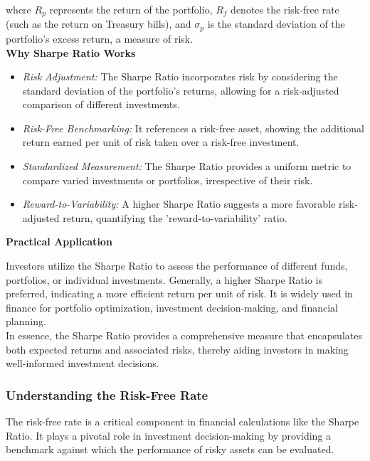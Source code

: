 \documentclass{article}
\begin{document}
where \( R_p \) represents the return of the portfolio, \( R_f \) denotes the risk-free rate (such as the return on Treasury bills), and \( \sigma_p \) is the standard deviation of the portfolio's excess return, a measure of risk. \\

\textbf{Why Sharpe Ratio Works}

\begin{itemize}
    \item \textit{Risk Adjustment:} The Sharpe Ratio incorporates risk by considering the standard deviation of the portfolio’s returns, allowing for a risk-adjusted comparison of different investments.
    \item \textit{Risk-Free Benchmarking:} It references a risk-free asset, showing the additional return earned per unit of risk taken over a risk-free investment.
    \item \textit{Standardized Measurement:} The Sharpe Ratio provides a uniform metric to compare varied investments or portfolios, irrespective of their risk.
    \item \textit{Reward-to-Variability:} A higher Sharpe Ratio suggests a more favorable risk-adjusted return, quantifying the 'reward-to-variability' ratio.
\end{itemize}

\textbf{Practical Application}

Investors utilize the Sharpe Ratio to assess the performance of different funds, portfolios, or individual investments. Generally, a higher Sharpe Ratio is preferred, indicating a more efficient return per unit of risk. It is widely used in finance for portfolio optimization, investment decision-making, and financial planning. \\

In essence, the Sharpe Ratio provides a comprehensive measure that encapsulates both expected returns and associated risks, thereby aiding investors in making well-informed investment decisions.

\subsubsection{Understanding the Risk-Free Rate}

The risk-free rate is a critical component in financial calculations like the Sharpe Ratio. It plays a pivotal role in investment decision-making by providing a benchmark against which the performance of risky assets can be evaluated. \\
\end{document}
